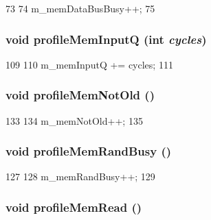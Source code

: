 \begin{DoxyCode}
73 {
74     m_memDataBusBusy++;
75 }
\end{DoxyCode}
\hypertarget{classMemCntrlProfiler_a4a3a012728231422d396cd10cbdf3d16}{
\subsubsection[{profileMemInputQ}]{\setlength{\rightskip}{0pt plus 5cm}void profileMemInputQ (int {\em cycles})}}
\label{classMemCntrlProfiler_a4a3a012728231422d396cd10cbdf3d16}



\begin{DoxyCode}
109 {
110     m_memInputQ += cycles;
111 }
\end{DoxyCode}
\hypertarget{classMemCntrlProfiler_a9c6e4338190ce42950932dd07b6bd632}{
\subsubsection[{profileMemNotOld}]{\setlength{\rightskip}{0pt plus 5cm}void profileMemNotOld ()}}
\label{classMemCntrlProfiler_a9c6e4338190ce42950932dd07b6bd632}



\begin{DoxyCode}
133 {
134     m_memNotOld++;
135 }
\end{DoxyCode}
\hypertarget{classMemCntrlProfiler_a091de1a0e944399fbb9ee4311a8dc1c4}{
\subsubsection[{profileMemRandBusy}]{\setlength{\rightskip}{0pt plus 5cm}void profileMemRandBusy ()}}
\label{classMemCntrlProfiler_a091de1a0e944399fbb9ee4311a8dc1c4}



\begin{DoxyCode}
127 {
128     m_memRandBusy++;
129 }
\end{DoxyCode}
\hypertarget{classMemCntrlProfiler_aa24e89520b2477766f4955368b1782af}{
\subsubsection[{profileMemRead}]{\setlength{\rightskip}{0pt plus 5cm}void profileMemRead ()}}
\label{classMemCntrlProfiler_aa24e89520b2477766f4955368b1782af}



